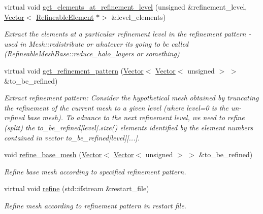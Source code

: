 \begin{DoxyCompactItemize}
virtual void \hyperlink{classoomph_1_1TreeBasedRefineableMeshBase_a65912e0ba140a141ef082639730aeb18}{get\+\_\+elements\+\_\+at\+\_\+refinement\+\_\+level} (unsigned \&refinement\+\_\+level, \hyperlink{classoomph_1_1Vector}{Vector}$<$ \hyperlink{classoomph_1_1RefineableElement}{Refineable\+Element} $\ast$$>$ \&level\+\_\+elements)
\begin{DoxyCompactList}\small\item\em Extract the elements at a particular refinement level in the refinement pattern -\/ used in Mesh\+::redistribute or whatever it\textquotesingle{}s going to be called (Refineable\+Mesh\+Base\+::reduce\+\_\+halo\+\_\+layers or something) \end{DoxyCompactList}\item 
virtual void \hyperlink{classoomph_1_1TreeBasedRefineableMeshBase_a6dba989c0d0735d8fe34ceb231425401}{get\+\_\+refinement\+\_\+pattern} (\hyperlink{classoomph_1_1Vector}{Vector}$<$ \hyperlink{classoomph_1_1Vector}{Vector}$<$ unsigned $>$ $>$ \&to\+\_\+be\+\_\+refined)
\begin{DoxyCompactList}\small\item\em Extract refinement pattern\+: Consider the hypothetical mesh obtained by truncating the refinement of the current mesh to a given level (where {\ttfamily level=0} is the un-\/refined base mesh). To advance to the next refinement level, we need to refine (split) the {\ttfamily to\+\_\+be\+\_\+refined}\mbox{[}level\mbox{]}.size() elements identified by the element numbers contained in {\ttfamily vector} to\+\_\+be\+\_\+refined\mbox{[}level\mbox{]}\mbox{[}...\mbox{]}. \end{DoxyCompactList}\item 
void \hyperlink{classoomph_1_1TreeBasedRefineableMeshBase_a77c2eb2c650ba34c79cf3b156204ee3b}{refine\+\_\+base\+\_\+mesh} (\hyperlink{classoomph_1_1Vector}{Vector}$<$ \hyperlink{classoomph_1_1Vector}{Vector}$<$ unsigned $>$ $>$ \&to\+\_\+be\+\_\+refined)
\begin{DoxyCompactList}\small\item\em Refine base mesh according to specified refinement pattern. \end{DoxyCompactList}\item 
virtual void \hyperlink{classoomph_1_1TreeBasedRefineableMeshBase_a5753ea33897c77342d00644bef86ba74}{refine} (std\+::ifstream \&restart\+\_\+file)
\begin{DoxyCompactList}\small\item\em Refine mesh according to refinement pattern in restart file. \end{DoxyCompactList}\item 
$$
\end{DoxyCompactItemize}
